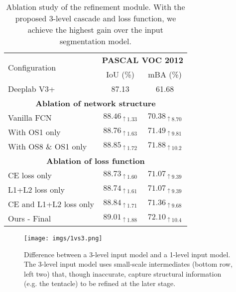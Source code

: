 \documentclass[10pt,twocolumn,letterpaper]{article}
\begin{document}
\begin{table}[t]
\centering
\begin{tabular}{l|c|c}
  \multirow{2}{*}{Configuration} & \multicolumn{2}{c}{\textbf{PASCAL VOC 2012}}\\
  & IoU (\%) & mBA (\%)\\
  \hhline{|=|=|=|}
  Deeplab V3+ & 87.13 & 61.68 \\
  \hline
  \multicolumn{3}{c}{\textbf{Ablation of network structure}} \\
  \Xhline{2\arrayrulewidth}
  Vanilla FCN & $88.46_{\uparrow1.33}$ & $70.38_{\uparrow8.70}$ \\
  With OS1 only & $88.76_{\uparrow1.63}$ & $71.49_{\uparrow9.81}$ \\
  With OS8 \& OS1 only & $88.85_{\uparrow1.72}$ & $71.88_{\uparrow10.2}$ \\
  \hline
  \multicolumn{3}{c}{\textbf{Ablation of loss function}} \\
  \Xhline{2\arrayrulewidth}
  CE loss only & $88.73_{\uparrow1.60}$ & $71.07_{\uparrow9.39}$ \\
  L1+L2 loss only & $88.74_{\uparrow1.61}$ & $71.07_{\uparrow9.39}$ \\
  CE and L1+L2 loss only  & $88.84_{\uparrow1.71}$ & $71.36_{\uparrow9.68}$ \\
  \Xhline{3\arrayrulewidth}
  Ours - Final & $\mathbf{89.01_{\uparrow1.88}}$ & $\mathbf{72.10_{\uparrow10.4}}$ \\
\end{tabular}
\caption{Ablation study of the refinement module. With the proposed 3-level cascade and loss function, we achieve the highest gain over the input segmentation model.}
\label{tab:ablation_rm}
\vspace{-0.15in}
\end{table}


\begin{figure}[t]
	\begin{center}
		\texttt{[image: imgs/1vs3.png]}
	\end{center}
	\vspace{-0.15in}
	\caption{Difference between a 3-level input model and a 1-level input model. The 3-level input model uses small-scale intermediates (bottom row, left two) that, though inaccurate, capture structural information (e.g. the tentacle) to be refined at the later stage.}
	\label{fig:1vs3}
	\vspace{-0.15in}
\end{figure}
\end{document}
